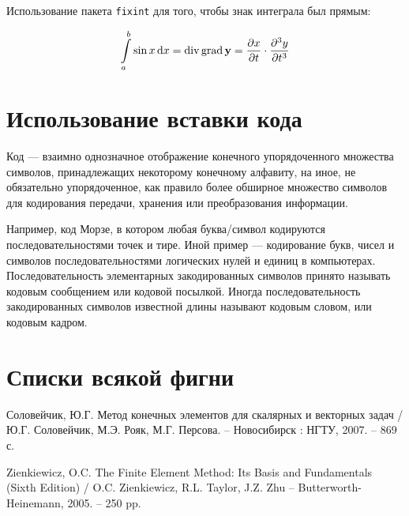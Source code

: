 \documentclass{universityreport}
\begin{document}
Использование пакета \texttt{fixint} для того, чтобы знак интеграла был прямым:

$$
\int\limits_{a}^{b} \sin x \operatorname{d}\!x = \operatorname{div} \operatorname{grad} \mathrm{\mathbf{y}} = \frac{\partial x}{\partial t} \cdot \frac{\partial^{3} y}{\partial t^{3}}
$$

\section{Использование вставки кода}

Код — взаимно однозначное отображение конечного упорядоченного множества символов, принадлежащих некоторому конечному алфавиту, на иное, не обязательно упорядоченное, как правило более обширное множество символов для кодирования передачи, хранения или преобразования информации.


Например, код Морзе, в котором любая буква/символ кодируются последовательностями точек и тире. Иной пример — кодирование букв, чисел и символов последовательностями логических нулей и единиц в компьютерах. Последовательность элементарных закодированных символов принято называть кодовым сообщением или кодовой посылкой. Иногда последовательность закодированных символов известной длины называют кодовым словом, или кодовым кадром. 

\section{Списки всякой фигни}

\listoffigures
\listoftables

\renewcommand\bibname{Список использованных источников}
\begin{thebibliography}{00}

		Соловейчик, Ю.Г. Метод конечных элементов для скалярных и векторных задач /
		Ю.Г. Соловейчик, М.Э. Рояк, М.Г. Персова. -- Новосибирск : НГТУ, 2007. -- 869 с.
		
		Zienkiewicz, O.C. The Finite Element Method: Its Basis and Fundamentals (Sixth Edition) / 
		O.C. Zienkiewicz, R.L. Taylor, J.Z. Zhu -- Butterworth-Heinemann, 2005. -- 250 pp.
		
\end{thebibliography}

\pagebreak
\end{document}
